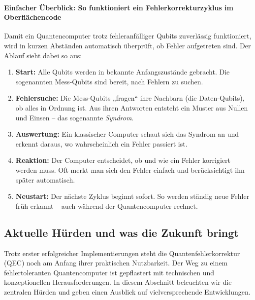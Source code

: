 \paragraph{Einfacher Überblick: So funktioniert ein Fehlerkorrekturzyklus im Oberflächencode}Damit ein Quantencomputer trotz fehleranfälliger Qubits zuverlässig funktioniert, wird in kurzen Abständen automatisch überprüft, ob Fehler aufgetreten sind. Der Ablauf sieht dabei so aus:

\begin{enumerate}
  \item \textbf{Start:}  
  Alle Qubits werden in bekannte Anfangszustände gebracht. Die sogenannten Mess-Qubits sind bereit, nach Fehlern zu suchen.

  \item \textbf{Fehlersuche:}  
  Die Mess-Qubits „fragen“ ihre Nachbarn (die Daten-Qubits), ob alles in Ordnung ist. Aus ihren Antworten entsteht ein Muster aus Nullen und Einsen – das sogenannte \emph{Syndrom}.

  \item \textbf{Auswertung:}  
  Ein klassischer Computer schaut sich das Syndrom an und erkennt daraus, wo wahrscheinlich ein Fehler passiert ist.

  \item \textbf{Reaktion:}  
  Der Computer entscheidet, ob und wie ein Fehler korrigiert werden muss. Oft merkt man sich den Fehler einfach und berücksichtigt ihn später automatisch.

  \item \textbf{Neustart:}  
  Der nächste Zyklus beginnt sofort. So werden ständig neue Fehler früh erkannt – auch während der Quantencomputer rechnet.
\end{enumerate}

\subsection{Aktuelle H\"urden und was die Zukunft bringt}\label{chap:QEC3.3}

Trotz erster erfolgreicher Implementierungen steht die Quantenfehlerkorrektur (QEC) noch am Anfang ihrer praktischen Nutzbarkeit. Der Weg zu einem fehlertoleranten Quantencomputer ist gepflastert mit technischen und konzeptionellen Herausforderungen. In diesem Abschnitt beleuchten wir die zentralen H\"urden und geben einen Ausblick auf vielversprechende Entwicklungen.\\

